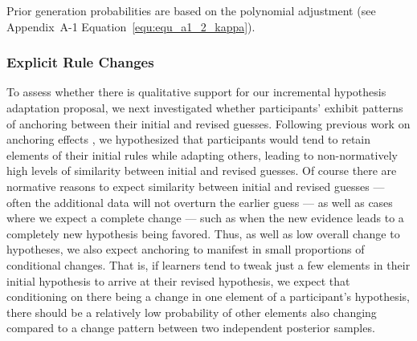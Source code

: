 \documentclass[doc,natbib,floatsintext]{apa7}
\newcommand\notesize{\fontsize{8pt}{9pt}\selectfont}
\begin{document}
\begin{table}[!th]
\begin{center} 
\small
\caption{Mean ($\pm SD$) log prior generation probability and fit (loglikelihood) for participants' guesses and posterior rule samples using $b$ = 5.} 
\label{sample-table} 
\end{center} 
\vspace{-.75cm}
{\notesize Prior generation probabilities are based on the polynomial adjustment (see Appendix~A-1 Equation~\ref{equ:equ_a1_2_kappa}).}
\end{table} 

\subsubsection{Explicit Rule Changes}
To assess whether there is qualitative support for our incremental hypothesis adaptation proposal, we next investigated whether participants' exhibit patterns of anchoring between their initial and revised guesses. Following previous work on anchoring effects \citep{dasgupta2017hypotheses, bramley2017formalizing, lieder2018anchoring}, we hypothesized that participants would tend to retain elements of their initial rules while adapting others, leading to non-normatively high levels of similarity between initial and revised guesses. Of course there are normative reasons to expect similarity between initial and revised guesses --- often the additional data will not overturn the earlier guess --- as well as cases where we expect a complete change --- such as when the new evidence leads to a completely new hypothesis being favored. Thus, as well as low overall change to hypotheses, we also expect anchoring to manifest in small proportions of conditional changes. That is, if learners tend to tweak just a few elements in their initial hypothesis to arrive at their revised hypothesis, we expect that conditioning on there being a change in one element of a participant's hypothesis, there should be a relatively low probability of other elements also changing compared to a change pattern between two independent posterior samples. 
\end{document}
